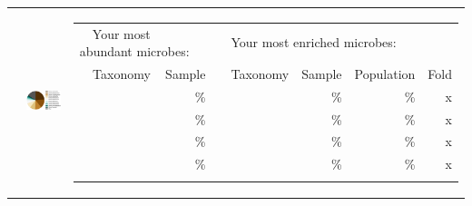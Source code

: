 \documentclass[landscape]{article}
\begin{document}
\begin{tabular*}{\textwidth}{ m{0.3in} m{4.0in} m{7.5in} }
	&
	\vspace{2mm}
	\hspace{-5mm}
	\includegraphics[scale=0.27]{pdfs-oralskin/figure2.pdf}
	
    &
    {\normalsize 
    \vspace{2.5mm}
    \parbox[b][][t]{6.5in}{
	\begin{tabular}{ c l r c l r r r }
    \multicolumn{3}{l}{\large ~~Your most abundant microbes:} & \multicolumn{5}{l}{\large ~~Your most enriched microbes:}\\ \addlinespace[2mm]
        \cline{2-3} \cline{5-8} \addlinespace[1mm]
        & Taxonomy & Sample & & Taxonomy & Sample & Population & Fold \\
        \cline{2-3} \cline{5-8} \addlinespace[1mm]
        & \abundTaxonA{} & \abundSamplA{}\% & & \enrichTaxonA{} & \enrichSamplA{}\% & \enrichPopulA{}\% & \enrichFoldA{}x \\
        & \abundTaxonB{} & \abundSamplB{}\% & & \enrichTaxonB{} & \enrichSamplB{}\% & \enrichPopulB{}\% & \enrichFoldB{}x \\
        & \abundTaxonC{} & \abundSamplC{}\% & & \enrichTaxonC{} & \enrichSamplC{}\% & \enrichPopulC{}\% & \enrichFoldC{}x \\
        & \abundTaxonD{} & \abundSamplD{}\% & & \enrichTaxonD{} & \enrichSamplD{}\% & \enrichPopulD{}\% & \enrichFoldD{}x \\
        \cline{2-3} \cline{5-8} \addlinespace[3mm]
        & \multicolumn{7}{p{5.6in}}{\footnotesize \rareList{}} \\
	\end{tabular}
	}
	}
\end{tabular*}

\vspace{5mm}
\end{document}
